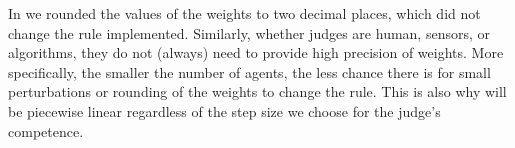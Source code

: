 \documentclass[letterpaper]{article} %
\newcommand{\nick}[1]{\todo[color=kentuckyblue!40,size=footnotesize]{Nick says: #1}}
\begin{document}
In  we rounded the values of the weights to two decimal places, which did not change the rule implemented. Similarly, whether judges are human, sensors, or algorithms, they do not (always) need to provide high precision of weights. More specifically, the smaller the number of agents, the less chance there is for small perturbations or rounding of the weights to change the rule. This is also why  will be piecewise linear regardless of the step size we choose for the judge's competence.






\end{document}
